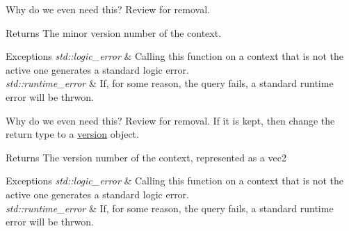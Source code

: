 \begin{DoxyRefList}
\item[\label{todo__todo000004}%
\hypertarget{todo__todo000004}{}%
Member \hyperlink{classgfx_1_1context_a42b72fb029aab81096e576b3a8a7de52}{gfx\-:\-:context\-:\-:minor\-\_\-version} () const ]Why do we even need this? Review for removal. \begin{DoxyReturn}{Returns}
The minor version number of the context. 
\end{DoxyReturn}

\begin{DoxyExceptions}{Exceptions}
{\em std\-::logic\-\_\-error} & Calling this function on a context that is not the active one generates a standard logic error. \\
\hline
{\em std\-::runtime\-\_\-error} & If, for some reason, the query fails, a standard runtime error will be thrwon.  \\
\hline
\end{DoxyExceptions}

\item[\label{todo__todo000005}%
\hypertarget{todo__todo000005}{}%
Member \hyperlink{classgfx_1_1context_ab8ca4b7f55d6a658f08db1078781e4ba}{gfx\-:\-:context\-:\-:version} () const ]Why do we even need this? Review for removal. If it is kept, then change the return type to a \hyperlink{classgfx_1_1version}{version} object. \begin{DoxyReturn}{Returns}
The version number of the context, represented as a vec2 
\end{DoxyReturn}

\begin{DoxyExceptions}{Exceptions}
{\em std\-::logic\-\_\-error} & Calling this function on a context that is not the active one generates a standard logic error. \\
\hline
{\em std\-::runtime\-\_\-error} & If, for some reason, the query fails, a standard runtime error will be thrwon.  \\
\hline
\end{DoxyExceptions}


\end{DoxyRefList}
